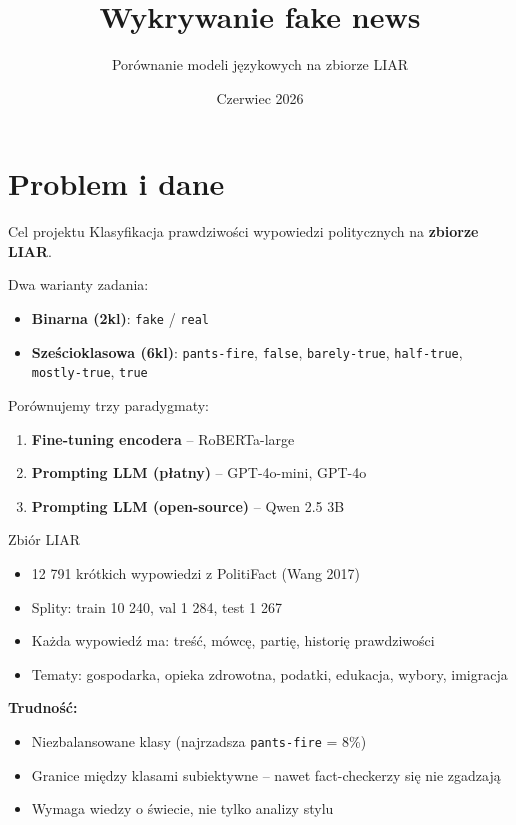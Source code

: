 \documentclass[10pt]{beamer}
\title{Wykrywanie fake news}
\subtitle{Porównanie modeli językowych na zbiorze LIAR}
\date{Czerwiec 2026}
\begin{document}
\maketitle

\section{Problem i dane}

\begin{frame}{Cel projektu}
  Klasyfikacja prawdziwości wypowiedzi politycznych na \textbf{zbiorze LIAR}.

  \vspace{0.5em}
  Dwa warianty zadania:
  \begin{itemize}
    \item \textbf{Binarna (2kl)}: \texttt{fake} / \texttt{real}
    \item \textbf{Sześcioklasowa (6kl)}: \texttt{pants-fire}, \texttt{false},
          \texttt{barely-true}, \texttt{half-true}, \texttt{mostly-true}, \texttt{true}
  \end{itemize}

  \vspace{0.5em}
  Porównujemy trzy paradygmaty:
  \begin{enumerate}
    \item \textbf{Fine-tuning encodera} -- RoBERTa-large
    \item \textbf{Prompting LLM (płatny)} -- GPT-4o-mini, GPT-4o
    \item \textbf{Prompting LLM (open-source)} -- Qwen 2.5 3B
  \end{enumerate}
\end{frame}

\begin{frame}{Zbiór LIAR}
  \begin{itemize}
    \item 12 791 krótkich wypowiedzi z PolitiFact (Wang 2017)
    \item Splity: train 10 240, val 1 284, test 1 267
    \item Każda wypowiedź ma: treść, mówcę, partię, historię prawdziwości
    \item Tematy: gospodarka, opieka zdrowotna, podatki, edukacja, wybory, imigracja
  \end{itemize}

  \vspace{0.5em}
  \textbf{Trudność:}
  \begin{itemize}
    \item Niezbalansowane klasy (najrzadsza \texttt{pants-fire} = 8\%)
    \item Granice między klasami subiektywne -- nawet fact-checkerzy się nie zgadzają
    \item Wymaga wiedzy o świecie, nie tylko analizy stylu
  \end{itemize}
\end{frame}
\end{document}
